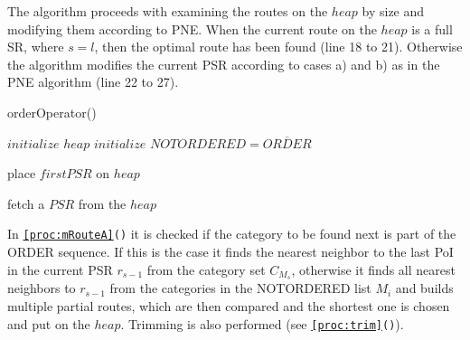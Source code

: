 The algorithm proceeds with examining the routes on the $heap$ by size and modifying them according to PNE. When the current route on the $heap$ is a full SR, where $s = l$, then the optimal route has been found (line 18 to 21). Otherwise the algorithm modifies the current PSR according to cases a) and b) as in the PNE algorithm (line 22 to 27). \newline

\begin{algorithm}[H]
\caption{orderOperator()}
\label{alg:order}
	
	
	\BlankLine
	
	$initialize$ $heap$\;
	$initialize$ $NOTORDERED = \overline{ORDER}$\;
	
	\BlankLine
	
	place $firstPSR$ on $heap$\;
	
	
	\BlankLine
	
	
	fetch a $PSR$ from the $heap$\;

\end{algorithm}

\pagebreak

In \texttt{\ref{proc:mRouteA}()} it is checked if the category to be found next is part of the ORDER sequence. If this is the case it finds the nearest neighbor to the last PoI in the current PSR $r_{s-1}$ from the category set $C_{M_{s}}$, otherwise it finds all nearest neighbors to $r_{s-1}$ from the categories in the NOTORDERED list $M_{i}$ and builds multiple partial routes, which are then compared and the shortest one is chosen and put on the $heap$.
Trimming is also performed (see \texttt{\ref{proc:trim}()}).

